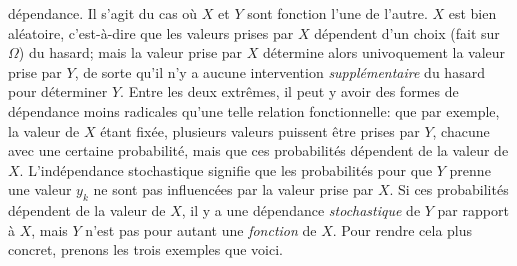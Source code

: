 d\'ependance. Il s'agit du cas o\`u $X$ et $Y$ sont fonction l'une de l'autre.
$X$ est  bien al\'eatoire, c'est-\`a-dire que les valeurs prises par $X$
d\'ependent d'un choix (fait sur $\Omega$) du hasard; mais la valeur prise
par $X$ d\'etermine alors univoquement la valeur prise par $Y$, de sorte
qu'il n'y a aucune intervention {\it suppl\'ementaire} du hasard pour 
d\'eterminer $Y$. Entre les deux extr\^emes, il peut y avoir des formes de
d\'ependance moins radicales qu'une telle relation fonctionnelle: que par
exemple, la valeur de $X$ \'etant fix\'ee, plusieurs valeurs puissent \^etre
prises par $Y$, chacune avec une certaine probabilit\'e, mais que ces
probabilit\'es d\'ependent de la valeur de $X$. L'ind\'ependance
stochastique signifie que les probabilit\'es pour que $Y$ prenne une valeur
$y_k$ ne sont pas influenc\'ees par la valeur prise par $X$. Si ces
probabilit\'es d\'ependent de la valeur de $X$, il y a une d\'ependance {\it
stochastique} de $Y$ par rapport \`a $X$, mais $Y$  n'est pas pour autant
une {\it fonction} de $X$. Pour rendre cela plus concret, prenons les trois
exemples que voici.  
\medskip

\def\hfq{\hfill\quad}
\def\cc#1{\hfill\quad #1\quad\hfill}
\def\tv{\vrule height 12pt depth 5pt width0.4pt}

